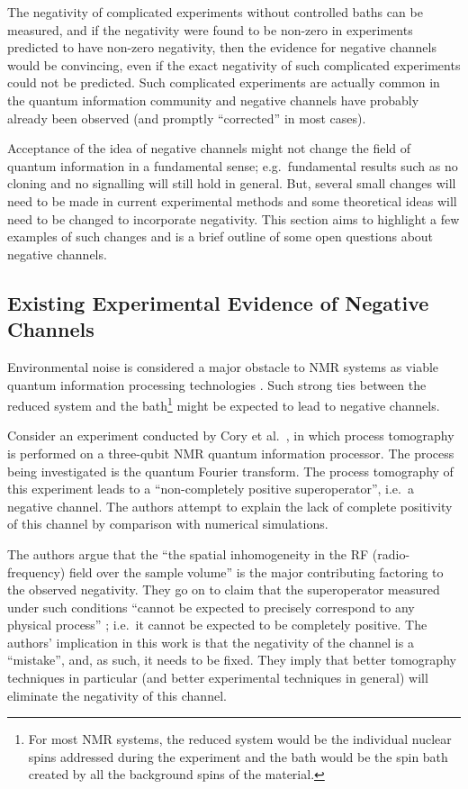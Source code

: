 The negativity of complicated experiments without controlled baths can be measured, and if the negativity were found to be non-zero in experiments predicted to have non-zero negativity, then the evidence for negative channels would be convincing, even if the exact negativity of such complicated experiments could not be predicted.  Such complicated experiments are actually common in the quantum information community and negative channels have probably already been observed (and promptly ``corrected'' in most cases).

Acceptance of the idea of negative channels might not change the field of quantum information in a fundamental sense; e.g.\ fundamental results such as no cloning and no signalling will still hold in general.  But, several small changes will need to be made in current experimental methods and some theoretical ideas will need to be changed to incorporate negativity.  This section aims to highlight a few examples of such changes and is a brief outline of some open questions about negative channels.

\subsection{Existing Experimental Evidence of Negative Channels}
\label{sec:Havel}

Environmental noise is considered a major obstacle to NMR systems as viable quantum information processing technologies \cite{Boulant2004}.  Such strong ties between the reduced system and the bath\footnote{For most NMR systems, the reduced system would be the individual nuclear spins addressed during the experiment and the bath would be the spin bath created by all the background spins of the material.} might be expected to lead to negative channels.

Consider an experiment conducted by Cory et al.\ \cite{Cory2004}, in which process tomography is performed on a three-qubit NMR quantum information processor.  The process being investigated is the quantum Fourier transform.  The process tomography of this experiment leads to a ``non-completely positive superoperator'', i.e.\ a negative channel.  The authors attempt to explain the lack of complete positivity of this channel by comparison with numerical simulations.

The authors argue that the ``the spatial inhomogeneity in the RF (radio-frequency) field over the sample volume'' \cite{Cory2004} is the major contributing factoring to the observed negativity.  They go on to claim that the superoperator measured under such conditions ``cannot be expected to precisely correspond to any physical process'' \cite{Cory2004}; i.e.\ it cannot be expected to be completely positive.  The authors' implication in this work is that the negativity of the channel is a ``mistake'', and, as such, it needs to be fixed.  They imply that better tomography techniques in particular (and better experimental techniques in general) will eliminate the negativity of this channel.  

